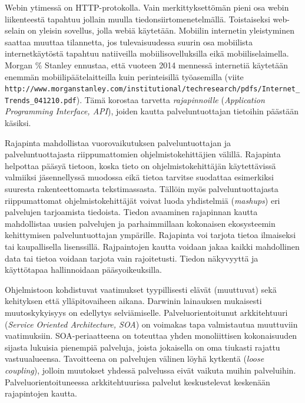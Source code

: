 \documentclass[finnish,gradu]{tktltiki}
\begin{document}
  Webin ytimessä on HTTP-protokolla. Vain merkittyksettömän pieni osa webin liikenteestä tapahtuu jollain muulla tiedonsiirtomenetelmällä. Toistaiseksi web-selain on yleisin sovellus, jolla webiä käytetään. Mobiilin internetin yleistyminen saattaa muuttaa tilannetta, jos tulevaisuudessa suurin osa mobiilista internetkäytöstä tapahtuu natiiveilla mobiilisovelluksilla eikä mobiiliselaimella. Morgan \% Stanley ennustaa, että vuoteen 2014 mennessä internetiä käytetään enemmän mobiilipäätelaitteilla kuin perinteisillä työasemilla (viite \verb!http://www.morganstanley.com/institutional/techresearch/pdfs/Internet_Trends_041210.pdf!). Tämä korostaa tarvetta \emph{rajapinnoille} (\emph{Application Programming Interface, API}), joiden kautta palveluntuottajan tietoihin päästään käsiksi.

  Rajapinta mahdollistaa vuorovaikutuksen palveluntuottajan ja palveluntuottajasta riippumattomien ohjelmistokehittäjien välillä. Rajapinta helpottaa pääsyä tietoon, koska tieto on ohjelmistokehittäjän käytettävissä valmiiksi jäsennellyssä muodossa eikä tietoa tarvitse suodattaa esimerkiksi suuresta rakenteettomasta tekstimassasta. Tällöin myös palveluntuottajasta riippumattomat ohjelmistokehittäjät voivat luoda yhdistelmiä (\emph{mashups}) eri palvelujen tarjoamista tiedoista. Tiedon avaaminen rajapinnan kautta mahdollistaa uusien palvelujen ja parhaimmillaan kokonaisen ekosysteemin kehittymisen palveluntuottajan ympärille. Rajapinta voi tarjota tietoa ilmaiseksi tai kaupallisella lisenssillä. Rajpaintojen kautta voidaan jakaa kaikki mahdollinen data tai tietoa voidaan tarjota vain rajoitetusti. Tiedon näkyvyyttä ja käyttötapaa hallinnoidaan pääsyoikeuksilla.

  Ohjelmistoon kohdistuvat vaatimukset tyypillisesti elävät (muuttuvat) sekä kehityksen että ylläpitovaiheen aikana. Darwinin lainauksen mukaisesti muutoskykyisyys on edellytys selviämiselle. Palveluorientoitunut arkkitehtuuri (\emph{Service Oriented Architecture, SOA}) on voimakas tapa valmistautua muuttuviin vaatimuksiin. SOA-periaatteena on toteuttaa yhden monoliittisen kokonaisuuden sijasta lukuisia pienempiä palveluja, joista jokaisella on oma tiukasti rajattu vastuualueensa. Tavoitteena on palvelujen välinen löyhä kytkentä (\emph{loose coupling}), jolloin muutokset yhdessä palvelussa eivät vaikuta muihin palveluihin. Palveluorientoituneessa arkkitehtuurissa palvelut keskustelevat keskenään rajapintojen kautta.
\end{document}
